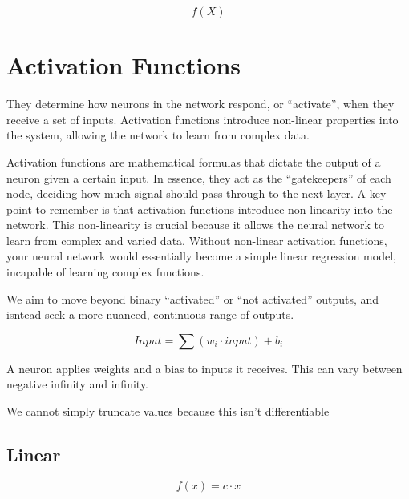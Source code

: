 \documentclass[11pt]{article}
\begin{document}


\tableofcontents

\clearpage

\begin{definition}\label{eq:activation-}
    \begin{equation*}
        f(X)
    \end{equation*}
\end{definition}

\section{Activation Functions}

They determine how neurons in the network respond, or ``activate'', when they receive a set of inputs. Activation functions introduce non-linear properties into the system, allowing the network to learn from complex data.

Activation functions are mathematical formulas that dictate the output of a neuron given a certain input. In essence, they act as the ``gatekeepers'' of each node, deciding how much signal should pass through to the next layer. A key point to remember is that activation functions introduce non-linearity into the network. This non-linearity is crucial because it allows the neural network to learn from complex and varied data. Without non-linear activation functions, your neural network would essentially become a simple linear regression model, incapable of learning complex functions.

We aim to move beyond binary ``activated'' or ``not activated'' outputs, and isntead seek a more nuanced, continuous range of outputs. 

\begin{equation*}
    Input = \sum(w_i \cdot input) + b_i
\end{equation*}

A neuron applies weights and a bias to inputs it receives. This can vary between negative infinity and infinity. 

We cannot simply truncate values because this isn't differentiable 

\subsection{Linear}

\begin{definition}\label{eq:activation-linear}
    \begin{equation*}
        f(x) = c\cdot x
    \end{equation*}
\end{definition}
\end{document}
